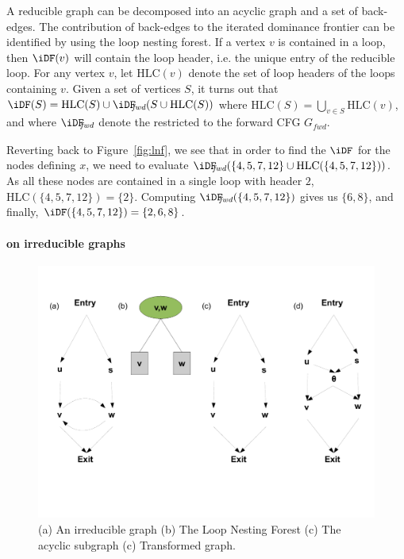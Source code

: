 {{\def\HLC{\mbox{HLC}} A reducible graph can be decomposed into an acyclic graph and a set of back-edges. 
  The contribution of back-edges to the iterated dominance frontier can be identified by using the loop nesting forest. 
  If a vertex $v$ is contained in a loop, then $\iDF(v)$ will contain the loop header, i.e. the unique entry of the reducible loop. 
  For any vertex $v$, let $\HLC(v)$ denote the set of loop headers of the loops containing $v$.
  Given a set of vertices $S$, it turns out that $\iDF(S) = \HLC(S) \cup \iDFfwd(S \cup \HLC(S))$ where $\HLC(S)=\bigcup_{v\in S} \HLC(v)$, and where $\iDFfwd$ denote the \iDF restricted to the forward CFG $G_{\textit{fwd}}$.

  Reverting back to Figure~\ref{fig:lnf}, we see that in order to find the $\iDF$ for the nodes defining $x$, we need to evaluate $\iDFfwd(\{4,5,7,12\} \cup \HLC(\{4,5,7,12\}))$. 
  As all these nodes are contained in a single loop with header $2$, $\HLC(\{4,5,7,12\}) = \{2\}$. 
  Computing $\iDFfwd(\{4,5,7,12\})$ gives us $\{6,8\}$, and finally, $\iDF(\{4,5,7,12\}) = \{2,6,8\}$. 
}

\paragraph{\iDF on irreducible graphs}

\begin{figure}[t]
  \centerline{\includegraphics[scale=0.3]{irred.pdf}}
  \caption{(a) An irreducible graph (b) The Loop Nesting Forest (c) The acyclic subgraph (c) Transformed
  graph.}
  \label{fig:irred}
\end{figure} 



}
